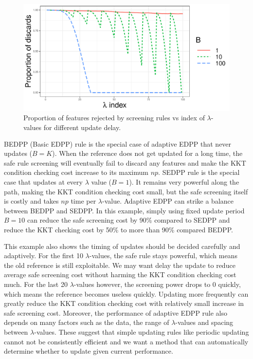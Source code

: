 \begin{figure}[H]
    \centering
    \includegraphics[scale = 0.6]{plots/batchsizes.pdf}    \caption{Proportion of features rejected by screening rules vs index of $\lambda$-values for different update delay.}
    \label{fig:3.4.1}
\end{figure}

BEDPP (Basic EDPP) rule is the special case of adaptive EDPP that never updates ($B=K$). When the reference does not get updated for a long time, the safe rule screening will eventually fail to discard any features and make the KKT condition checking cost increase to its maximum $np$. SEDPP rule is the special case that updates at every $\lambda$ value ($B=1$). It remains very powerful along the path, making the KKT condition checking cost small, but the safe screening itself is costly and takes $np$ time per $\lambda$-value. Adaptive EDPP can strike a balance between BEDPP and SEDPP. In this example, simply using fixed update period $B=10$ can reduce the safe screening cost by 90\% compared to SEDPP and reduce the KKT checking cost by 50\% to more than 90\% compared BEDPP.

This example also shows the timing of updates should be decided carefully and adaptively. For the first 10 $\lambda$-values, the safe rule stays powerful, which means the old reference is still exploitable. We may want delay the update to reduce average safe screening cost without harming the KKT condition checking cost much. For the last 20 $\lambda$-values however, the screening power drops to 0 quickly, which means the reference becomes useless quickly. Updating more frequently can greatly reduce the KKT condition checking cost with relatively small increase in safe screening cost. Moreover, the performance of adaptive EDPP rule also depends on many factors such as the data, the range of $\lambda$-values and spacing between $\lambda$-values. These suggest that simple updating rules like periodic updating cannot not be consistently efficient and we want a method that can automatically determine whether to update given current performance.

